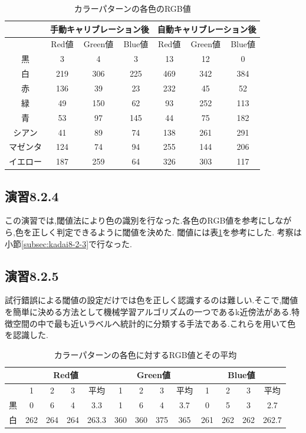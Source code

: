 \documentclass{jarticle}
\begin{document}
\begin{table}[H]
\caption{カラーパターンの各色のRGB値}
	\begin{center}
		\begin{tabular}{|c|c|c|c|c|c|c|}\hline 
			& \multicolumn{3}{c|}{手動キャリブレーション後}&\multicolumn{3}{c|}{自動キャリブレーション後} \\ \hline 
			& Red値 & Green値 & Blue値 & Red値 & Green値 & Blue値 \\ \hline 
		黒 & 3 & 4 & 3 & 13 & 12 & 0  \\ \hline
		白 & 219 & 306 & 225 & 469 & 342 & 384  \\ \hline 
		赤 & 136 & 39 & 23 & 232 & 45 & 52  \\ \hline
		緑 & 49 & 150 & 62& 93 & 252 & 113  \\ \hline
		青 & 53 & 97 & 145 & 44 & 75 & 182  \\ \hline
		シアン & 41 & 89 & 74 & 138 & 261 & 291  \\ \hline
		マゼンタ & 124 & 74 & 94 & 255 & 144 & 206  \\ \hline
		イエロー & 187 & 259 & 64 & 326 & 303 & 117  \\ \hline
		\end{tabular}
	\end{center}
\label{table:enshu8-2-3} 
\end{table}


\subsection{演習8.2.4}
この演習では,閾値法により色の識別を行なった.各色のRGB値を参考にしながら,色を正しく判定できるように閾値を決めた.
閾値には表\ref{table:enshu8-2-3}を参考にした.
考察は小節\ref{subsec:kadai8-2-3}で行なった.

\subsection{演習8.2.5}
試行錯誤による閾値の設定だけでは色を正しく認識するのは難しい.そこで,閾値を簡単に決める方法として機械学習アルゴリズムの一つであるk近傍法がある.特徴空間の中で最も近いラベルへ統計的に分類する手法である.これらを用いて色を認識した.
\begin{table}[H]
\caption{カラーパターンの各色に対するRGB値とその平均}
	\begin{center}
		\begin{tabular}{|c|c|c|c|c|c|c|c|c|c|c|c|c|}\hline 
		& \multicolumn{4}{c|}{Red値} & \multicolumn{4}{c|}{Green値} & \multicolumn{4}{c|}{Blue値} \\ \hline
			& 1 & 2 & 3 &平均& 1 & 2 & 3 &平均& 1 & 2 & 3 &平均 \\ \hline
		黒 & 0 & 6 & 4 & 3.3& 1 & 6 & 4 & 3.7& 0 & 5 & 3 & 2.7 \\ \hline
		白 &262&264&264&263.3&360&360&375&365&261&262&262&262.7 \\ \hline
		\end{tabular}
	\end{center}
\label{table:enshu8-2-5} 
\end{table}
\end{document}
